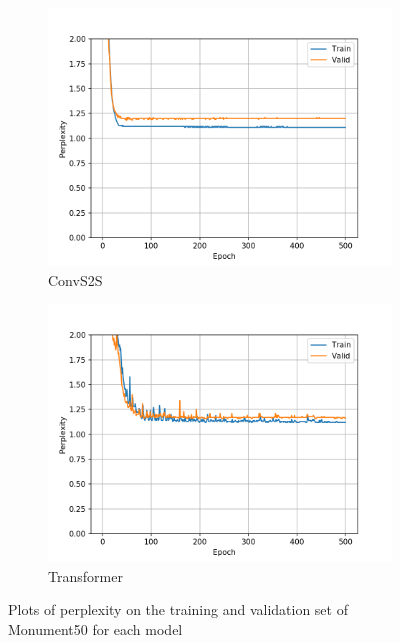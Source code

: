 \begin{figure}[H]
\begin{subfigure}{0.45\textwidth}
\includegraphics[width=\textwidth]{../results/monument2_2/run2/fconv_wmt_en_de/ppls.png} 
\caption{ConvS2S}
\label{fig:monu2 convs2s ppl}
\end{subfigure}
\hfill
\begin{subfigure}{0.45\textwidth}
\includegraphics[width=\textwidth]{../results/monument2_2/run1/transformer_iwslt_de_en/ppls.png}
\caption{Transformer}
\label{fig:monu2 transformer ppl}
\end{subfigure}
\hfill
\caption{Plots of perplexity on the training and validation set of Monument50 for each model}
\label{fig:monu2 ppls}
\end{figure}


